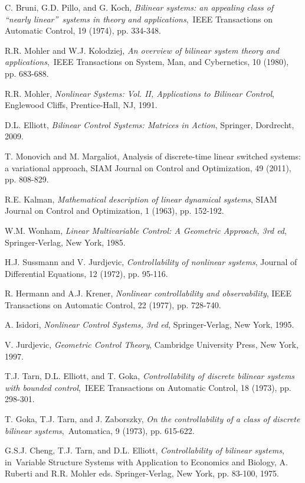 \documentclass[journal,a4paper,12pt,onecolumn]{IEEEtran}
\begin{document}
\begin{thebibliography}{99}
\bibitem{} C. Bruni, G.D. Pillo, and G. Koch, \textit{Bilinear systems: an
appealing class of \textquotedblleft nearly linear\textquotedblright\
systems in theory and applications},\ IEEE Transactions on Automatic
Control, 19 (1974), pp. 334-348.

\bibitem{} R.R. Mohler and W.J. Kolodziej, \textit{An overview of bilinear
system theory and applications},\ IEEE Transactions on System, Man, and
Cybernetics, 10 (1980), pp. 683-688.

\bibitem{} R.R. Mohler, \textit{Nonlinear Systems: Vol. II, Applications to
Bilinear Control}, Englewood Cliffs, Prentice-Hall, NJ, 1991.

\bibitem{} D.L. Elliott, \textit{Bilinear Control Systems: Matrices in Action}, Springer, Dordrecht, 2009.

\bibitem{} T. Monovich and M. Margaliot, Analysis of discrete-time linear
switched systems: a variational approach, SIAM Journal on Control and
Optimization, 49 (2011), pp. 808-829.

\bibitem{} R.E. Kalman, \textit{Mathematical description of linear dynamical
systems}, SIAM Journal on Control and Optimization, 1 (1963), pp. 152-192.

\bibitem{} W.M. Wonham, \textit{Linear Multivariable Control: A Geometric
Approach, 3rd ed}, Springer-Verlag, New York, 1985.

\bibitem{} H.J. Sussmann and V. Jurdjevic, \textit{Controllability of
nonlinear systems}, Journal of Differential Equations, 12 (1972), pp. 95-116.

\bibitem{} R. Hermann and A.J. Krener, \textit{Nonlinear controllability and
observability}, IEEE Transactions on Automatic Control, 22 (1977), pp.
728-740.

\bibitem{} A. Isidori, \textit{Nonlinear Control Systems, 3rd ed},
Springer-Verlag, New York, 1995.

\bibitem{} V. Jurdjevic, \textit{Geometric Control Theory}, Cambridge
University Press, New York, 1997.

\bibitem{} T.J. Tarn, D.L. Elliott, and T. Goka, \textit{Controllability of
discrete bilinear systems with bounded control},\ IEEE Transactions on
Automatic Control, 18 (1973), pp. 298-301.

\bibitem{} T. Goka, T.J. Tarn, and J. Zaborszky, \textit{On the
controllability of a class of discrete bilinear systems},\ Automatica, 9
(1973), pp. 615-622.

\bibitem{} G.S.J. Cheng, T.J. Tarn, and D.L. Elliott, \textit{Controllability of bilinear systems}, in\ Variable Structure Systems with
Application to Economics and Biology, A. Ruberti and R.R. Mohler eds.
Springer-Verlag, New York, pp. 83-100, 1975.


\end{thebibliography}
\end{document}

